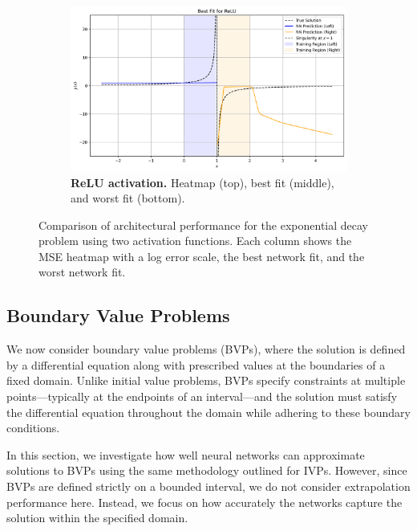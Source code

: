 \begin{figure}[h]
\begin{subfigure}[t]{0.48\textwidth}
        \includegraphics[width=\textwidth]{graphics/ivp_singularity_best_fit_relu_8layers_8width.png}
        \caption{\textbf{ReLU activation.} Heatmap (top), best fit (middle), and worst fit (bottom).}
        \label{fig:ivp_periodic_relu}
    \end{subfigure}
    \hspace*{\fill}
    \caption{Comparison of architectural performance for the exponential decay problem using two 
    activation functions. Each column shows the MSE heatmap with a log error scale,
    the best network fit, and the worst network fit.}
    \label{fig:ivp_periodic_sidebyside}
\end{figure}



\subsection{Boundary Value Problems}\label{sec:BVPs}


We now consider boundary value problems (BVPs), where the solution is defined by a 
differential equation along with prescribed values at the boundaries of a fixed domain. Unlike 
initial value problems, BVPs specify constraints at multiple points—typically at the endpoints of 
an interval—and the solution must satisfy the differential equation throughout the domain while 
adhering to these boundary conditions.

In this section, we investigate how well neural networks can approximate solutions to BVPs using 
the same methodology outlined for IVPs. However, since BVPs are defined strictly on a bounded 
interval, we do not consider extrapolation performance here. Instead, we focus on how accurately 
the networks capture the solution within the specified domain.

